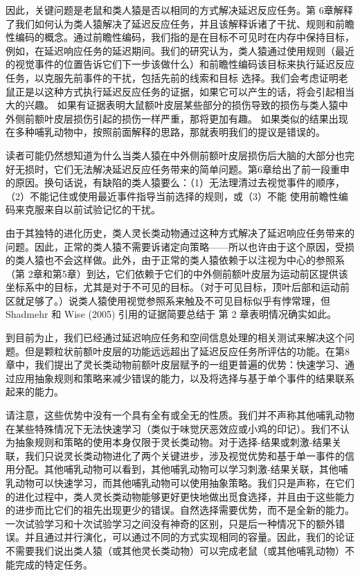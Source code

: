 \par 
因此，关键问题是老鼠和类人猿是否以相同的方式解决延迟反应任务。第 6章解释了我们如何认为类人猿解决了延迟反应任务，并且该解释诉诸了干扰、规则和前瞻性编码的概念。通过前瞻性编码，我们指的是在目标不可见时在内存中保持目标，例如，在延迟响应任务的延迟期间。我们的研究认为，类人猿通过使用规则（最近的视觉事件的位置告诉它们下一步该做什么）和前瞻性编码该目标来执行延迟反应任务，以克服先前事件的干扰，包括先前的线索和目标 选择。我们会考虑证明老鼠正是以这种方式执行延迟反应任务的证据，如果它可以产生的话，将会引起相当大的兴趣。 如果有证据表明大鼠额叶皮层某些部分的损伤导致的损伤与类人猿中外侧前额叶皮层损伤引起的损伤一样严重，那将更加有趣。 如果类似的结果出现在多种哺乳动物中，按照前面解释的思路，那就表明我们的提议是错误的。
\par 
读者可能仍然想知道为什么当类人猿在中外侧前额叶皮层损伤后大脑的大部分也完好无损时，它们无法解决延迟反应任务带来的简单问题。第6章给出了前一段重申的原因。换句话说，有缺陷的类人猿要么：（1）无法理清过去视觉事件的顺序，（2）不能记住或使用最近事件指导当前选择的规则，或（3）不能 使用前瞻性编码来克服来自以前试验记忆的干扰。
\par 
由于其独特的进化历史，类人灵长类动物通过这种方式解决了延迟响应任务带来的问题。因此，正常的类人猿不需要诉诸定向策略——所以也许由于这个原因，受损的类人猿也不会这样做。此外，由于正常的类人猿依赖于以注视为中心的参照系（第 2章和第5章）到达，它们依赖于它们的中外侧前额叶皮层为运动前区提供该坐标系中的目标，尤其是对于不可见的目标。（对于可见目标，顶叶后部和运动前区就足够了。）说类人猿使用视觉参照系来触及不可见目标似乎有悖常理，但 Shadmehr 和 Wise (2005) 引用的证据简要总结于 第 2 章表明情况确实如此。
\par 
到目前为止，我们已经通过延迟响应任务和空间信息处理的相关测试来解决这个问题。但是颗粒状前额叶皮层的功能远远超出了延迟反应任务所评估的功能。在第8章中，我们提出了灵长类动物前额叶皮层赋予的一组更普遍的优势：快速学习、通过应用抽象规则和策略来减少错误的能力，以及将选择与基于单个事件的结果联系起来的能力。
\par 
请注意，这些优势中没有一个具有全有或全无的性质。我们并不声称其他哺乳动物在某些特殊情况下无法快速学习（类似于味觉厌恶效应或小鸡的印记）。我们不认为抽象规则和策略的使用本身仅限于灵长类动物。对于选择-结果或刺激-结果关联，我们只说灵长类动物进化了两个关键进步，涉及视觉优势和基于单一事件的信用分配。其他哺乳动物可以看到，其他哺乳动物可以学习刺激-结果关联，其他哺乳动物可以快速学习，而其他哺乳动物可以使用抽象策略。我们只是声称，在它们的进化过程中，类人灵长类动物能够更好更快地做出觅食选择，并且由于这些能力的进步而比它们的祖先出现更少的错误。自然选择需要优势，而不是全新的能力。一次试验学习和十次试验学习之间没有神奇的区别，只是后一种情况下的额外错误。并且通过并行演化，可以通过不同的方式实现相同的容量。因此，我们的论证不需要我们说出类人猿（或其他灵长类动物）可以完成老鼠（或其他哺乳动物）不能完成的特定任务。
